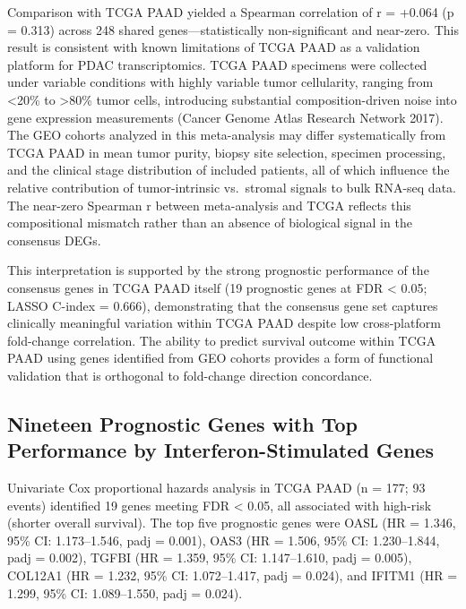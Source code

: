 \documentclass[
  12pt,
]{article}
\begin{document}
Comparison with TCGA PAAD yielded a Spearman correlation of r = +0.064
(p = 0.313) across 248 shared genes---statistically non-significant and
near-zero. This result is consistent with known limitations of TCGA PAAD
as a validation platform for PDAC transcriptomics. TCGA PAAD specimens
were collected under variable conditions with highly variable tumor
cellularity, ranging from \textless20\% to \textgreater80\% tumor cells,
introducing substantial composition-driven noise into gene expression
measurements (Cancer Genome Atlas Research Network 2017). The GEO
cohorts analyzed in this meta-analysis may differ systematically from
TCGA PAAD in mean tumor purity, biopsy site selection, specimen
processing, and the clinical stage distribution of included patients,
all of which influence the relative contribution of tumor-intrinsic
vs.~stromal signals to bulk RNA-seq data. The near-zero Spearman r
between meta-analysis and TCGA reflects this compositional mismatch
rather than an absence of biological signal in the consensus DEGs.

This interpretation is supported by the strong prognostic performance of
the consensus genes in TCGA PAAD itself (19 prognostic genes at FDR
\textless{} 0.05; LASSO C-index = 0.666), demonstrating that the
consensus gene set captures clinically meaningful variation within TCGA
PAAD despite low cross-platform fold-change correlation. The ability to
predict survival outcome within TCGA PAAD using genes identified from
GEO cohorts provides a form of functional validation that is orthogonal
to fold-change direction concordance.

\subsection{Nineteen Prognostic Genes with Top Performance by
Interferon-Stimulated
Genes}\label{nineteen-prognostic-genes-with-top-performance-by-interferon-stimulated-genes}

Univariate Cox proportional hazards analysis in TCGA PAAD (n = 177; 93
events) identified 19 genes meeting FDR \textless{} 0.05, all associated
with high-risk (shorter overall survival). The top five prognostic genes
were OASL (HR = 1.346, 95\% CI: 1.173--1.546, padj = 0.001), OAS3 (HR =
1.506, 95\% CI: 1.230--1.844, padj = 0.002), TGFBI (HR = 1.359, 95\% CI:
1.147--1.610, padj = 0.005), COL12A1 (HR = 1.232, 95\% CI: 1.072--1.417,
padj = 0.024), and IFITM1 (HR = 1.299, 95\% CI: 1.089--1.550, padj =
0.024).
\end{document}
